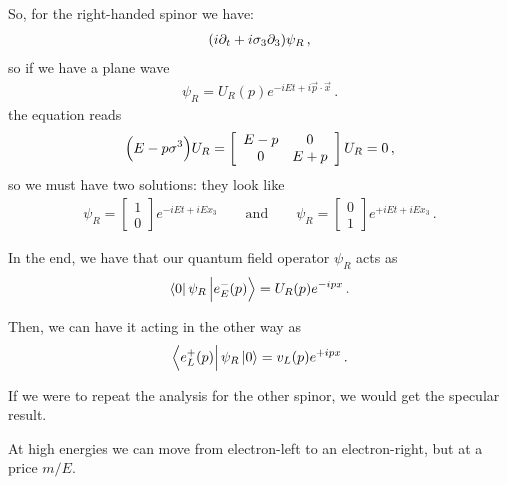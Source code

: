 \documentclass[main.tex]{subfiles}
\begin{document}
So, for the right-handed spinor we have:
%
\begin{align}
\qty(i \partial_{t} + i \sigma_{3} \partial_3 ) \psi_{R}
\,,
\end{align}
%
so if we have a plane wave 
%
\begin{align}
\psi_{R} = U_R (p) e^{-iEt + i \vec{p} \cdot \vec{x}}
\,.
\end{align}
%
the equation reads 
%
\begin{subequations}
\begin{align}
\qty(E - p \sigma^{3}) U_R = \left[\begin{array}{cc}
E-p & 0 \\ 
0 & E+p
\end{array}\right] U_{R} = 0
\,,
\end{align}
\end{subequations}
%
so we must have two solutions: they look like 
%
\begin{subequations}
\begin{align}
\psi_{R} = \left[\begin{array}{c}
1 \\ 
0
\end{array}\right] e^{-i Et + i E x_3 }
\qquad \text{and} \qquad
\psi_{R} = \left[\begin{array}{c}
0 \\ 
1
\end{array}\right] e^{+i Et + i E x_3 }  
\,.
\end{align}
\end{subequations}


In the end, we have that our quantum field operator \(\psi_{R}\) acts as 
%
\begin{align}
\bra{0}\psi_{R} \ket{e^{-}_{E} (p)} = U_R(p) e^{-ipx}
\,.
\end{align}

Then, we can have it acting in the other way as 
%
\begin{align}
\bra{e^{+}_{L}(p)} \psi_{R} \ket{0} = v_L (p) e^{+ipx}
\,.
\end{align}


If we were to repeat the analysis for the other spinor, we would get the specular result. 

At high energies we can move from electron-left to an electron-right, but at a price \(m / E\). 
\end{document}

